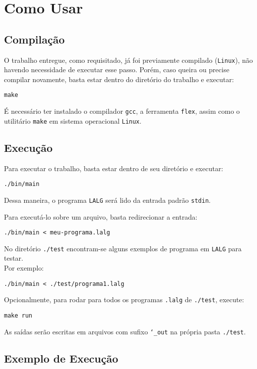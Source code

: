 \section{Como Usar \label{sec:como-usar}}

\subsection{Compilação}

O trabalho entregue, como requisitado, já foi previamente compilado (\texttt{Linux}), não havendo necessidade de executar esse passo. Porém, caso queira ou precise compilar novamente, basta estar dentro do diretório do trabalho e executar:

	\indent\indent\texttt{make}

É necessário ter instalado o compilador \texttt{gcc}, a ferramenta \texttt{flex}, assim como o utilitário \texttt{make} em sistema operacional \texttt{Linux}.

\subsection{Execução}

Para executar o trabalho, basta estar dentro de seu diretório e executar:

	\indent\indent\texttt{./bin/main}

Dessa maneira, o programa \texttt{LALG} será lido da entrada padrão \texttt{stdin}.

Para executá-lo sobre um arquivo, basta redirecionar a entrada:

	\indent\indent\texttt{./bin/main < meu-programa.lalg}

No diretório \texttt{./test} encontram-se alguns exemplos de programa em \texttt{LALG} para testar.\\
Por exemplo:

	\indent\indent\texttt{./bin/main < ./test/programa1.lalg}

Opcionalmente, para rodar para todos os programas \texttt{.lalg} de \texttt{./test}, execute:

	\indent\indent\texttt{make run}

As saídas serão escritas em arquivos com sufixo \texttt{\char`_out} na própria pasta \texttt{./test}.

\newpage
\subsection{Exemplo de Execução}

